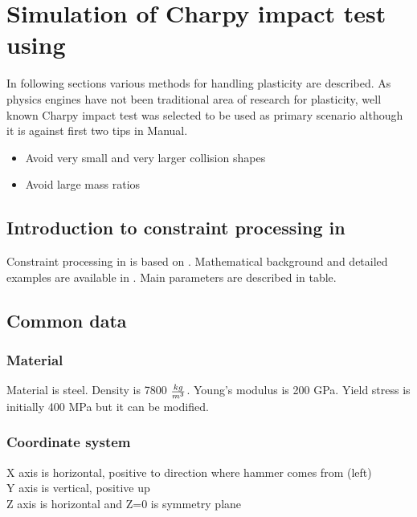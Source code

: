 \section{Simulation of Charpy impact test using \bullet}
\label{sec:bullet-plasticity}

In following sections various methods for handling plasticity are described.
As physics engines have not been traditional area of research for plasticity, 
well known Charpy impact test was selected to be used as primary scenario
although it is against first two tips in \bullet Manual.

\begin{itemize}
\item Avoid very small and very larger collision shapes
\item Avoid large mass ratios
\end{itemize}

\subsection{Introduction to constraint processing in \bullet}
Constraint processing in \bullet is based on \cite{ode}.
 Mathematical background and detailed examples are available in \cite{ode.joints}.
Main parameters are described in table.

\subsection{Common data}

\subsubsection{Material}

Material is steel. Density is 7800 $kg\over{m^{3}}$. Young’s modulus is 200 GPa. Yield stress is initially 400 MPa but it can be modified.

\subsubsection{Coordinate system}

X axis is horizontal, positive to direction where hammer comes from (left)\\
Y axis is vertical, positive up\\
Z axis is horizontal and Z=0 is symmetry plane

